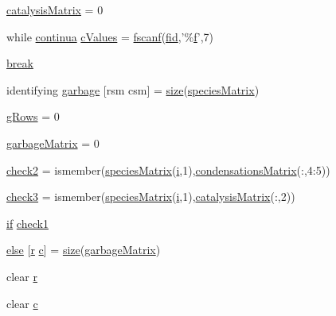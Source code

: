 \begin{DoxyCompactItemize}
\item 
\hyperlink{a00027_a0810027f58d6be965e44b7b84c44ace8}{catalysis\-Matrix} = 0
\item 
while \hyperlink{a00030_a9c951ebd5bc3f1adce943bee1255f4d6}{continua} \hyperlink{a00027_ad4ba7701967c1da20171228afccb7081}{c\-Values} = \hyperlink{a00025_a028ac102a731e62fb0a7439381f566c1}{fscanf}(\hyperlink{a00031_ae9011d40c6f13e68e6f07156e0da7c5d}{fid},'\%\hyperlink{a00025_a9c5a71c46b1abb8b7df5ebeac6c81535}{f}',7)
\item 
\hyperlink{a00027_a91cf6fbebedd86150a36e5ac3d5d3bfc}{break}
\item 
identifying \hyperlink{a00027_abe2562f47a009cdc636cec6fe7b1036b}{garbage} \mbox{[}rsm csm\mbox{]} = \hyperlink{a00104_ae113ea7f9e515a12ac4b5595c6faf61e}{size}(\hyperlink{a00027_ab9e70ab48bc489696c53ad7946d9dfd2}{species\-Matrix})
\item 
\hyperlink{a00027_af33e0ef530936979d29418a30cb262d0}{g\-Rows} = 0
\item 
\hyperlink{a00027_a81fbeed23d0dfd3b031fce1839f131fe}{garbage\-Matrix} = 0
\item 
\hyperlink{a00027_a98a8838a85ed24032563a44271b1525a}{check2} = ismember(\hyperlink{a00027_ab9e70ab48bc489696c53ad7946d9dfd2}{species\-Matrix}(\hyperlink{a00113_ad3efca1ea6e3333daf30719ee0501862}{i},1),\hyperlink{a00030_a84a949cdae2c03193c84caf27f855b30}{condensations\-Matrix}(\-:,4\-:5))
\item 
\hyperlink{a00027_adfd17509248a56986475a25ee50fe488}{check3} = ismember(\hyperlink{a00027_ab9e70ab48bc489696c53ad7946d9dfd2}{species\-Matrix}(\hyperlink{a00113_ad3efca1ea6e3333daf30719ee0501862}{i},1),\hyperlink{a00030_a244eec8903103b5bbddef461276286ce}{catalysis\-Matrix}(\-:,2))
\item 
\hyperlink{a00030_a01d55766b8058903dd360b4bda71f9f5}{if} \hyperlink{a00027_a62c10db322670bdabb633eb294c4fcec}{check1}
\item 
\hyperlink{a00027_af5946383720aa572eb93e1e63afc23c2}{else} \mbox{[}\hyperlink{a00031_ac862e7284527eb913b1351c8bfb8e079}{r} \hyperlink{a00035_a6be92348ba85ef257b11d06209e1d7b6}{c}\mbox{]} = \hyperlink{a00104_ae113ea7f9e515a12ac4b5595c6faf61e}{size}(\hyperlink{a00027_acdc35755c8d07d7b7df426e77ae26506}{garbage\-Matrix})
\item 
clear \hyperlink{a00027_ac862e7284527eb913b1351c8bfb8e079}{r}
\item 
clear \hyperlink{a00027_a8e54ca14679a1ce9245a3b7d55d95570}{c}
\end{DoxyCompactItemize}


